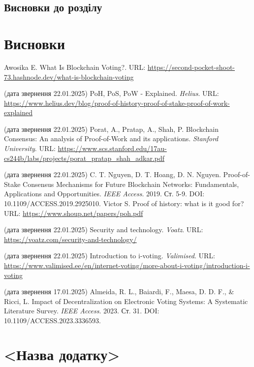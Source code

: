 \documentclass[14pt]{extreport}
\begin{document}
  \section{}
  \section{Висновки до розділу}
  
  \chapter*{Висновки}
  
  \renewcommand\bibname{\MakeUppercase{Список літератури}}
  \begin{thebibliography}{99}
     Awosika E. What Is Blockchain Voting?. URL: \url{https://second-pocket-shoot-73.hashnode.dev/what-is-blockchain-voting}

    (дата звернення 22.01.2025)
     PoH, PoS, PoW - Explained. \textit{Helius}. URL: \url{https://www.helius.dev/blog/proof-of-history-proof-of-stake-proof-of-work-explained}
    
    (дата звернення 22.01.2025)
     Porat, A., Pratap, A., Shah, P. Blockchain Consensus: An analysis of Proof-of-Work and its applications. \textit{Stanford University}. URL: \url{https://www.scs.stanford.edu/17au-cs244b/labs/projects/porat_pratap_shah_adkar.pdf}
    
    (дата звернення 22.01.2025)
     C. T. Nguyen, D. T. Hoang, D. N. Nguyen. Proof-of-Stake Consensus Mechanisms for Future Blockchain Networks: Fundamentals, Applications and Opportunities. \textit{IEEE Access}. 2019. Ст. 5-9. DOI: 10.1109/ACCESS.2019.2925010.
     Victor S. Proof of history: what is it good for? URL: \url{https://www.shoup.net/papers/poh.pdf}
    
    (дата звернення 22.01.2025)
     Security and technology. \textit{Voatz}. URL: \url{https://voatz.com/security-and-technology/}
    
    (дата звернення 22.01.2025)
     Introduction to i-voting. \textit{Valimised}. 
    URL: \url{https://www.valimised.ee/en/internet-voting/more-about-i-voting/introduction-i-voting}
    
    (дата звернення 17.01.2025)
     Almeida, R. L., Baiardi, F., Maesa, D. D. F., \& Ricci, L. Impact of Decentralization on Electronic Voting Systems: A Systematic Literature Survey. \textit{IEEE Access}. 2023. Ст. 31. DOI: 10.1109/ACCESS.2023.3336593.
  \end{thebibliography}
  
  \appendix
  \renewcommand{\thechapter}{\Alph{chapter}}
  \renewcommand{\chaptername}{Додаток}
  
  \chapter{<Назва додатку>}
  
\end{document}
